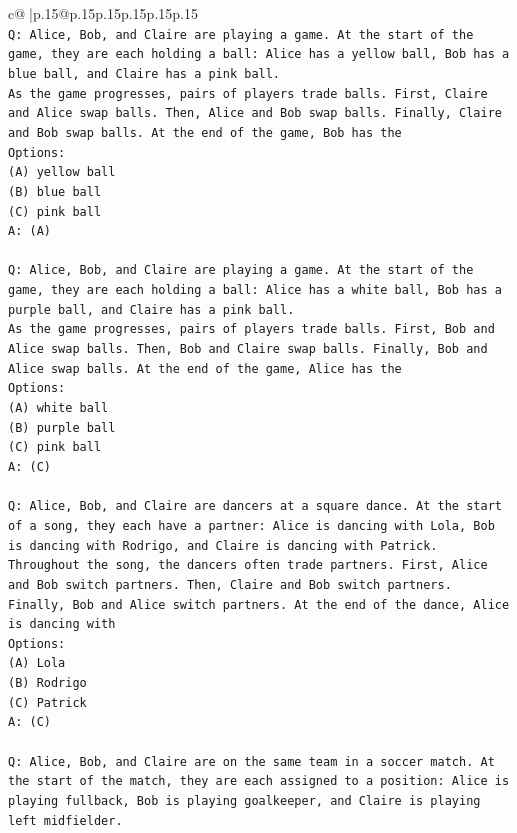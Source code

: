 \documentclass{article}
\begin{document}
{\begin{supertabular}{c@{$\;$}|p{.15\linewidth}@{}p{.15\linewidth}p{.15\linewidth}p{.15\linewidth}p{.15\linewidth}p{.15\linewidth}}
{{{\\ 
\texttt{Q: Alice, Bob, and Claire are playing a game. At the start of the game, they are each holding a ball: Alice has a yellow ball, Bob has a blue ball, and Claire has a pink ball.} \\
\texttt{As the game progresses, pairs of players trade balls. First, Claire and Alice swap balls. Then, Alice and Bob swap balls. Finally, Claire and Bob swap balls. At the end of the game, Bob has the} \\
\texttt{Options:} \\
\texttt{(A) yellow ball} \\
\texttt{(B) blue ball} \\
\texttt{(C) pink ball} \\
\texttt{A: (A)} \\
\\ 
\texttt{Q: Alice, Bob, and Claire are playing a game. At the start of the game, they are each holding a ball: Alice has a white ball, Bob has a purple ball, and Claire has a pink ball.} \\
\texttt{As the game progresses, pairs of players trade balls. First, Bob and Alice swap balls. Then, Bob and Claire swap balls. Finally, Bob and Alice swap balls. At the end of the game, Alice has the} \\
\texttt{Options:} \\
\texttt{(A) white ball} \\
\texttt{(B) purple ball} \\
\texttt{(C) pink ball} \\
\texttt{A: (C)} \\
\\ 
\texttt{Q: Alice, Bob, and Claire are dancers at a square dance. At the start of a song, they each have a partner: Alice is dancing with Lola, Bob is dancing with Rodrigo, and Claire is dancing with Patrick.} \\
\texttt{Throughout the song, the dancers often trade partners. First, Alice and Bob switch partners. Then, Claire and Bob switch partners. Finally, Bob and Alice switch partners. At the end of the dance, Alice is dancing with} \\
\texttt{Options:} \\
\texttt{(A) Lola} \\
\texttt{(B) Rodrigo} \\
\texttt{(C) Patrick} \\
\texttt{A: (C)} \\
\\ 
\texttt{Q: Alice, Bob, and Claire are on the same team in a soccer match. At the start of the match, they are each assigned to a position: Alice is playing fullback, Bob is playing goalkeeper, and Claire is playing left midfielder.} \\
}}}
\end{supertabular}}
\end{document}
